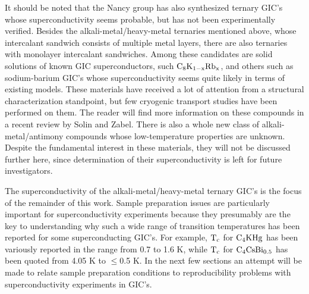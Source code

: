         It should be noted   that the  Nancy  group has  also   synthesized
ternary GIC's whose  superconductivity  seems  probable, but has not   been
experimentally verified.   Besides   the alkali-metal/heavy-metal ternaries
mentioned above,  whose  intercalant  sandwich  consists of  multiple metal
layers, there are   also ternaries  with  monolayer intercalant sandwiches.
Among these candidates are  solid solutions of known  GIC  superconductors,
such $\rm C_8K_{1-x}Rb_x$,\cite{billaud74} and others such as sodium-barium
GIC's\cite{billaud74a,billaud78} whose superconductivity seems quite likely
in  terms of existing   models.\cite{M143,fischer85}  These materials  have
received    a  lot of    attention  from  a   structural   characterization
standpoint,\cite{chow83,chow87a} but  few cryogenic  transport studies  have been
performed  on  them.  The reader will find more information on these
compounds in a recent review by Solin and Zabel.\cite{solin88}
There   is   also   a  whole   new    class     of
alkali-metal/antimony compounds  whose  low-temperature\cite{essaddek88,elmakrini88}  properties
are unknown.   Despite the  fundamental interest  in these materials, they
will  not be  discussed  further  here,    since  determination  of   their
superconductivity is left for future investigators.

        The superconductivity of the alkali-metal/heavy-metal ternary GIC's
is the focus of the remainder of this  work.  Sample preparation issues are
particularly  important  for   superconductivity  experiments  because they
presumably are the key to understanding why such a wide range of transition
temperatures   has  been  reported  for some    superconducting GIC's.  For
example, $\rm T_c$  for $\rm  C_4KHg$  has been  variously reported in  the
range from 0.7\cite{iye82}  to 1.6 K,\cite{N128}  while $\rm  T_c$ for $\rm
C_4CsBi_{0.5}$ has been  quoted from 4.05  K\cite{lagrange85} to  $\leq$0.5
K.\cite{E291} In the next few  sections an  attempt will  be made to relate
sample    preparation  conditions    to   reproducibility  problems    with
superconductivity experiments in GIC's.

